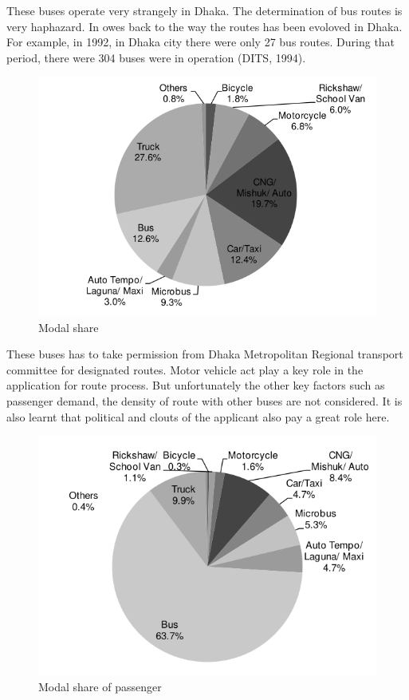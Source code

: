 \documentclass[
  11pt,
]{article}
\begin{document}
These buses operate very strangely in Dhaka. The determination of bus
routes is very haphazard. In owes back to the way the routes has been
evoloved in Dhaka. For example, in 1992, in Dhaka city there were only
27 bus routes. During that period, there were 304 buses were in
operation (DITS, 1994).

\begin{figure}  
 \begin{center}
    \includegraphics{./figures/rstp_modal_share_traffic.png}  
  \caption{Modal share} 
\end{center}
\end{figure}

These buses has to take permission from Dhaka Metropolitan Regional
transport committee for designated routes. Motor vehicle act play a key
role in the application for route process. But unfortunately the other
key factors such as passenger demand, the density of route with other
buses are not considered. It is also learnt that political and clouts of
the applicant also pay a great role here.

\begin{figure}  
 \begin{center}
    \includegraphics{./figures/rstp_modal_share_passenger.png}  
  \caption{Modal share of passenger} 
\end{center}
\end{figure}
\end{document}
